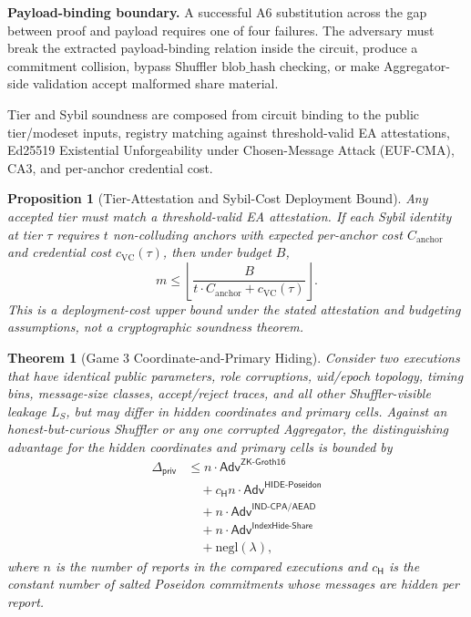 \documentclass[journal]{IEEEtran}
\theoremstyle{definition}
\theoremstyle{plain}
\newtheorem{theorem}{Theorem}
\newtheorem{proposition}{Proposition}
\begin{document}
\noindent\textbf{Payload-binding boundary.}
A successful A6 substitution across the gap between proof and payload requires
one of four failures. The
adversary must break the extracted payload-binding relation inside the circuit, produce
a commitment collision, bypass Shuffler $\mathrm{blob\_hash}$ checking, or make
Aggregator-side validation accept malformed share material.

Tier and Sybil soundness are composed from circuit binding to the public
tier/modeset inputs, registry matching against threshold-valid EA
attestations, Ed25519 Existential Unforgeability under Chosen-Message Attack (EUF-CMA), CA3, and per-anchor credential cost.

\begin{proposition}[Tier-Attestation and Sybil-Cost Deployment Bound]
  \label{prop:bounded-sybil}
  Any accepted tier must match a threshold-valid EA attestation. If each Sybil
  identity at tier $\tau$ requires $t$ non-colluding anchors with expected
  per-anchor cost $C_{\mathrm{anchor}}$ and credential cost
  $c_{\mathrm{VC}}(\tau)$, then under budget $B$,
  \begin{equation}
    m \le
    \left\lfloor
    \frac{B}{t\cdot C_{\mathrm{anchor}} + c_{\mathrm{VC}}(\tau)}
    \right\rfloor.
  \end{equation}
  This is a deployment-cost upper bound under the stated attestation and
  budgeting assumptions, not a cryptographic soundness theorem.
\end{proposition}

\begin{theorem}[Game 3 Coordinate-and-Primary Hiding]
  \label{thm:coordinate-primary-hiding}
  Consider two executions that have identical public parameters, role
  corruptions, uid/epoch topology, timing bins, message-size classes,
  accept/reject traces, and all other Shuffler-visible leakage \(L_S\), but may
  differ in hidden coordinates and primary cells. Against an honest-but-curious
  Shuffler or any one corrupted Aggregator, the distinguishing advantage for the
  hidden coordinates and primary cells is bounded by
\begin{equation}
  \label{eq:g3-main-bound}
  \begin{aligned}
    \Delta_{\mathsf{priv}}
    &\le n\cdot\mathsf{Adv}^{\mathsf{ZK\text{-}Groth16}} \\
    &\quad {}+ c_{\mathsf{H}}n\cdot
    \mathsf{Adv}^{\mathsf{HIDE\text{-}Poseidon}} \\
    &\quad {}+ n\cdot\mathsf{Adv}^{\mathsf{IND\text{-}CPA/AEAD}} \\
    &\quad {}+ n\cdot\mathsf{Adv}^{\mathsf{IndexHide\text{-}Share}} \\
    &\quad {}+ \mathrm{negl}(\lambda),
  \end{aligned}
\end{equation}
\noindent where \(n\) is the number of reports in the compared executions and
\(c_{\mathsf{H}}\) is the constant number of salted Poseidon commitments whose
messages are hidden per report.
\end{theorem}
\end{document}
